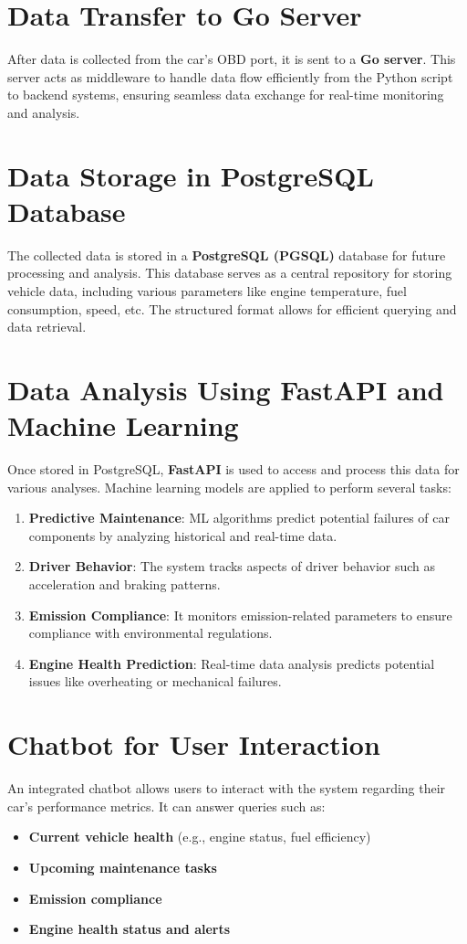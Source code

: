 \section{Data Transfer to Go Server}
After data is collected from the car’s OBD port, it is sent to a \textbf{Go server}. This server acts as middleware to handle data flow efficiently from the Python script to backend systems, ensuring seamless data exchange for real-time monitoring and analysis.

\section{Data Storage in PostgreSQL Database}
The collected data is stored in a \textbf{PostgreSQL (PGSQL)} database for future processing and analysis. This database serves as a central repository for storing vehicle data, including various parameters like engine temperature, fuel consumption, speed, etc. The structured format allows for efficient querying and data retrieval.

\section{Data Analysis Using FastAPI and Machine Learning}
Once stored in PostgreSQL, \textbf{FastAPI} is used to access and process this data for various analyses. Machine learning models are applied to perform several tasks:

\begin{enumerate}
    \item \textbf{Predictive Maintenance}: ML algorithms predict potential failures of car components by analyzing historical and real-time data.
    \item \textbf{Driver Behavior}: The system tracks aspects of driver behavior such as acceleration and braking patterns.
    \item \textbf{Emission Compliance}: It monitors emission-related parameters to ensure compliance with environmental regulations.
    \item \textbf{Engine Health Prediction}: Real-time data analysis predicts potential issues like overheating or mechanical failures.
\end{enumerate}

\section{Chatbot for User Interaction}
An integrated chatbot allows users to interact with the system regarding their car's performance metrics. It can answer queries such as:
\begin{itemize}
    \item \textbf{Current vehicle health} (e.g., engine status, fuel efficiency)
    \item \textbf{Upcoming maintenance tasks}
    \item \textbf{Emission compliance}
    \item \textbf{Engine health status and alerts}
\end{itemize}

